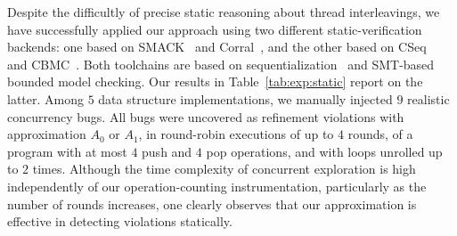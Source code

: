 Despite the difficultly of precise static reasoning about thread interleavings,
we have successfully applied our approach using two different
static-verification backends: one based on SMACK~\cite{conf/cav/RakamaricE14}
and Corral~\cite{conf/cav/LalQL12}, and the other based on
CSeq~\cite{conf/ase/FischerIP13} and CBMC~\cite{conf/tacas/KroeningT14}. Both
toolchains are based on sequentialization~\cite{journals/fmsd/LalR09} and
SMT-based bounded model checking. Our results in Table~\ref{tab:exp:static}
report on the latter. Among $5$ data structure implementations, we manually
injected $9$ realistic concurrency bugs. All bugs were uncovered as refinement
violations with approximation $A_0$ or $A_1$, in round-robin executions of up
to $4$ rounds, of a program with at most $4$ {\sf push} and $4$ {\sf pop}
operations, and with loops unrolled up to $2$ times. Although the time
complexity of concurrent exploration is high independently of our
operation-counting instrumentation, particularly as the number of rounds
increases, one clearly observes that our approximation is effective in
detecting violations statically.

